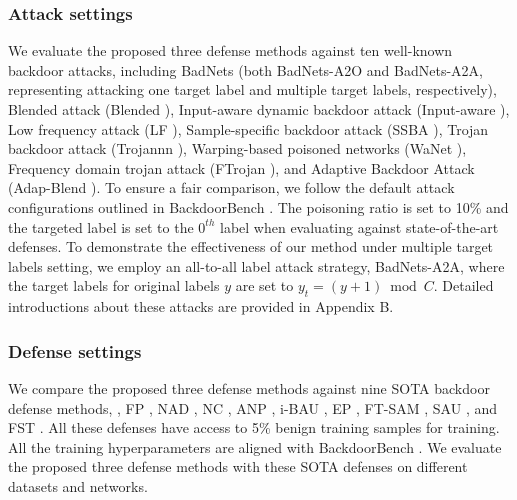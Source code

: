 \subsubsection{Attack settings}
We evaluate the proposed three defense methods against ten well-known backdoor attacks, including BadNets \cite{gu2019badnets} (both BadNets-A2O and BadNets-A2A, representing attacking one target label and multiple target labels, respectively), Blended attack (Blended \cite{chen2017targeted}), Input-aware dynamic backdoor attack (Input-aware \cite{nguyen2020input}), Low frequency attack (LF \cite{zeng2021rethinking}), Sample-specific backdoor attack (SSBA \cite{li2021invisible}), Trojan backdoor attack (Trojannn \cite{Trojannn}), Warping-based poisoned networks (WaNet \cite{nguyen2021wanet}), Frequency domain trojan attack (FTrojan \cite{wang2022invisible}), and Adaptive Backdoor Attack (Adap-Blend \cite{qi2023revisiting}). To ensure a fair comparison, we follow  the default attack configurations outlined in BackdoorBench \cite{wubackdoorbench}. The poisoning ratio is set to 10\% and the targeted label is set to the $0^{th}$ label when evaluating against state-of-the-art defenses. To demonstrate the effectiveness of our method under multiple target labels setting, we employ an all-to-all label attack strategy, BadNets-A2A, where the target labels for original labels $y$ are set to $y_t=(y+1) \bmod C$. Detailed introductions about these attacks are provided in Appendix B.

\subsubsection{Defense settings}
We compare the proposed three defense methods against nine SOTA backdoor defense methods, \ie, FP \cite{liu2018fine}, NAD \cite{li2021neural}, NC \cite{wang2019neural}, ANP \cite{wu2021adversarial}, i-BAU \cite{zeng2022adversarial}, EP \cite{zheng2022pre}, FT-SAM \cite{zhu2023enhancing}, SAU \cite{wei2023shared}, and FST \cite{min2024towards}. All these defenses have access to 5\% benign training samples for training. All the training hyperparameters are aligned with BackdoorBench \cite{wubackdoorbench}. We evaluate the proposed three defense methods with these SOTA defenses on different datasets and networks. 

